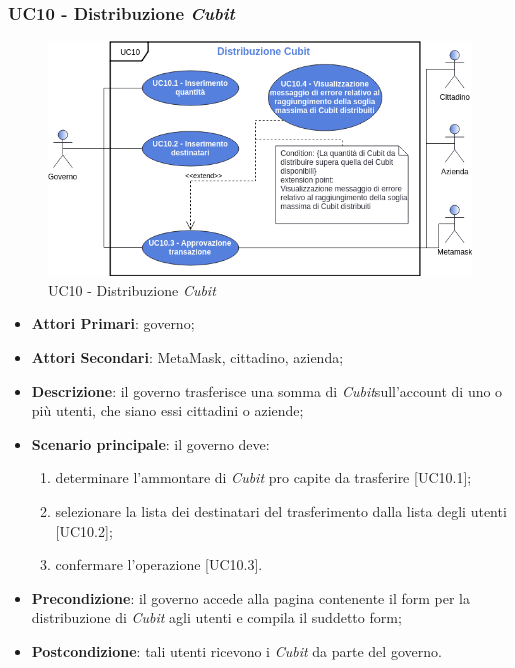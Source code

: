 \subsubsection{UC10 - Distribuzione \textit{Cubit}}
\begin{figure}[h]
	\includegraphics[width=13.5cm]{res/images/UC10Distribuzione.png} %
	\centering
	\caption{UC10 - Distribuzione \textit{Cubit}}
	
\end{figure}
\begin{itemize}
	\item \textbf{Attori Primari}: governo;
	\item \textbf{Attori Secondari}: MetaMask\glo, cittadino, azienda\glo;
	\item \textbf{Descrizione}: il governo trasferisce una somma di \textit{Cubit}\glosp sull'account di uno o più  utenti, che siano essi cittadini o aziende;
	\item \textbf{Scenario principale}: il governo deve:
	 \begin{enumerate}[label=\alph*.]
		\item determinare l'ammontare di \textit{Cubit} pro capite da trasferire [UC10.1];
		\item  selezionare la lista dei destinatari del trasferimento dalla lista degli utenti [UC10.2];
		\item confermare l'operazione [UC10.3].
	\end{enumerate}

	\item \textbf{Precondizione}: il governo accede alla pagina contenente il form per la distribuzione di \textit{Cubit} agli utenti e compila il suddetto form;
	\item \textbf{Postcondizione}: tali utenti ricevono i \textit{Cubit} da parte del governo.
\end{itemize}

